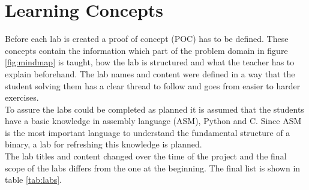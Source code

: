 \section{Learning Concepts}
Before each lab is created a proof of concept (POC) has to be defined. These concepts contain the information which part of the problem domain in figure \ref{fig:mindmap} is taught, how the lab is structured and what the teacher has to explain beforehand. The lab names and content were defined in a way that the student solving them has a clear thread to follow and goes from easier to harder exercises. \\
To assure the labs could be completed as planned it is assumed that the students have a basic knowledge in assembly language (ASM), Python and C. Since ASM is the most important language to understand the fundamental structure of a binary, a lab for refreshing this knowledge is planned.\\
The lab titles and content changed over the time of the project and the final scope of the labs differs from the one at the beginning. The final list is shown in table \ref{tab:labs}. 


